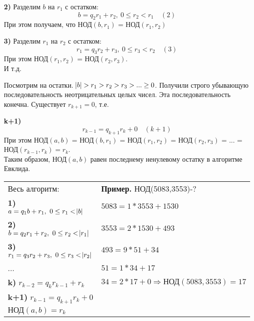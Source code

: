 \documentclass{article}
\begin{document}
  \textbf{2)} Разделим \( b \) на \( r_1 \) с остатком: \[ b = q_2r_1 + r_2,\ 0 \leq r_2 < r_1\quad (2) \]
  При этом получаем, что НОД\( (b,r_1) \) = НОД\( (r_1,r_2) \)

  \textbf{3)} Разделим \( r_1 \) на \( r_2 \) с остатком: \[ r_1 = q_3r_2 + r_3,\ 0 \leq r_3 < r_2\quad (3) \]
  При этом НОД\( (r_1, r_2) \) = НОД\( (r_2, r_3) \).\\
  И т.д.

  Посмотрим на остатки. \( \abs{b} > r_1 > r_2 > r_3 > ... \geq 0 \). Получили строго убывающую последовательность неотрицательных целых чисел. Эта последовательность конечна. Существует \( r_{k+1} = 0 \), т.е.

  \textbf{k+1)} \[ r_{k-1} = q_{k+1}r_k + 0\quad (k+1) \]
  При этом НОД\( (a,b) \) = НОД\( (b,r_1) \) = НОД\( (r_1,r_2) \) = НОД\( (r_2,r_3) \) = ... = НОД\( (r_{k-1},r_k) = r_k \).\\
  Таким образом, НОД\( (a,b) \) равен последнему ненулевому остатку в алгоритме Евклида.

  \begin{tabular}{ll}
    Весь алгоритм: & \textbf{Пример.} НОД(5083,3553)-?\\
    \textbf{1)} \( a = q_1b + r_1,\ 0 \leq r_1 < \abs{b} \) & \( 5083 = 1*3553 + 1530 \)\\
    \textbf{2)} \( b = q_2r_1 + r_2,\ 0 \leq r_2 < \abs{r_1} \) & \( 3553 = 2*1530 + 493 \)\\
    \textbf{3)} \( r_1 = q_3r_2 + r_3,\ 0 \leq r_3 < \abs{r_2} \) & \( 493 = 9*51 + 34 \)\\
    ...& \( 51 = 1*34 + 17 \)\\
    \textbf{k)} \( r_{k-2} = q_kr_{k-1} + r_k \) & \( 34 = 2*17 + 0 \Rightarrow \textrm{НОД}(5083,3553) = 17\)\\
    \textbf{k+1)} \( r_{k-1} = q_{k+1}r_{k} + 0 \) & \\
    \( \textrm{НОД}(a,b) = r_k \) & \\
  \end{tabular}
  
\end{document}
